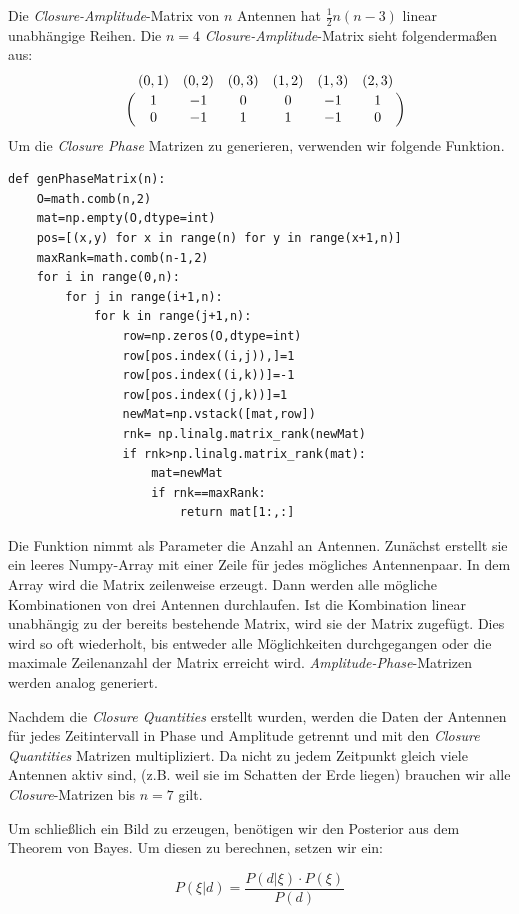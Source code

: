 Die \emph{Closure-Amplitude}-Matrix von $n$ Antennen hat $\frac{1}{2}n(n-3)$ linear unabhängige Reihen. Die $n=4$ \emph{Closure-Amplitude}-Matrix sieht folgendermaßen aus:
\begin{equation}
\bordermatrix{
~ &(0,1)&(0,2)&(0,3)&(1,2)&(1,3)&(2,3)\cr
~&1&-1&0&0&-1&1 \cr
~&0&-1&1&1&-1&0 \cr
}
\end{equation}
Um die \emph{Closure Phase} Matrizen zu generieren, verwenden wir folgende Funktion. 
\begin{verbatim}
def genPhaseMatrix(n):
    O=math.comb(n,2)
    mat=np.empty(O,dtype=int)
    pos=[(x,y) for x in range(n) for y in range(x+1,n)]
    maxRank=math.comb(n-1,2)
    for i in range(0,n):
        for j in range(i+1,n):
            for k in range(j+1,n):
                row=np.zeros(O,dtype=int)
                row[pos.index((i,j)),]=1
                row[pos.index((i,k))]=-1
                row[pos.index((j,k))]=1
                newMat=np.vstack([mat,row])
                rnk= np.linalg.matrix_rank(newMat)
                if rnk>np.linalg.matrix_rank(mat):
                    mat=newMat
                    if rnk==maxRank:
                        return mat[1:,:]
\end{verbatim}
Die Funktion nimmt als Parameter die Anzahl an Antennen. Zunächst erstellt sie ein leeres Numpy-Array mit einer Zeile für jedes mögliches Antennenpaar. In dem Array wird die Matrix zeilenweise erzeugt. Dann werden alle mögliche Kombinationen von drei Antennen durchlaufen. Ist die Kombination linear unabhängig zu der bereits bestehende Matrix, wird sie der Matrix zugefügt. Dies wird so oft wiederholt, bis entweder alle Möglichkeiten durchgegangen oder die maximale Zeilenanzahl der Matrix erreicht wird. \emph{Amplitude-Phase}-Matrizen werden analog generiert.

Nachdem die \emph{Closure Quantities} erstellt wurden, werden die Daten der Antennen für jedes Zeitintervall in Phase und Amplitude getrennt und mit den \emph{Closure Quantities} Matrizen multipliziert. Da nicht zu jedem Zeitpunkt gleich viele Antennen aktiv sind, (z.B. weil sie im Schatten der Erde liegen) brauchen wir alle \emph{Closure}-Matrizen bis $n=7$ gilt.

Um schließlich ein Bild zu erzeugen, benötigen wir den Posterior aus dem Theorem von Bayes. Um diesen zu berechnen, setzen wir ein: 


\begin{equation}
P(\xi|d)= \frac {P(d|\xi)\cdot P(\xi)}{ P(d) }
\end{equation}

